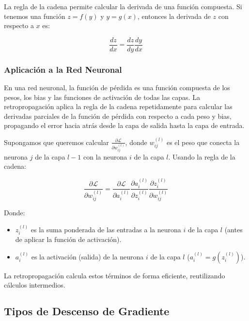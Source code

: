 \documentclass{article}
\begin{document}
La regla de la cadena permite calcular la derivada de una función compuesta.  Si tenemos una función \(z = f(y)\) y \(y = g(x)\), entonces la derivada de \(z\) con respecto a \(x\) es:

\[
\frac{dz}{dx} = \frac{dz}{dy} \frac{dy}{dx}
\]

\subsubsection{Aplicación a la Red Neuronal}

En una red neuronal, la función de pérdida es una función compuesta de los pesos, los bias y las funciones de activación de todas las capas.  La retropropagación aplica la regla de la cadena repetidamente para calcular las derivadas parciales de la función de pérdida con respecto a cada peso y bias, propagando el error hacia atrás desde la capa de salida hasta la capa de entrada.

Supongamos que queremos calcular \(\frac{\partial \mathcal{L}}{\partial w_{ij}^{(l)}}\), donde \(w_{ij}^{(l)}\) es el peso que conecta la neurona \(j\) de la capa \(l-1\) con la neurona \(i\) de la capa \(l\). Usando la regla de la cadena:

\[
\frac{\partial \mathcal{L}}{\partial w_{ij}^{(l)}} = \frac{\partial \mathcal{L}}{\partial a_i^{(l)}} \frac{\partial a_i^{(l)}}{\partial z_i^{(l)}} \frac{\partial z_i^{(l)}}{\partial w_{ij}^{(l)}}
\]

Donde:

\begin{itemize}
    \item  \(z_i^{(l)}\) es la suma ponderada de las entradas a la neurona \(i\) de la capa \(l\) (antes de aplicar la función de activación).
    \item \(a_i^{(l)}\) es la activación (salida) de la neurona \(i\) de la capa \(l\)  (\(a_i^{(l)} = g(z_i^{(l)})\)).
\end{itemize}

La retropropagación calcula estos términos de forma eficiente, reutilizando cálculos intermedios.

\subsection{Tipos de Descenso de Gradiente}
\end{document}
